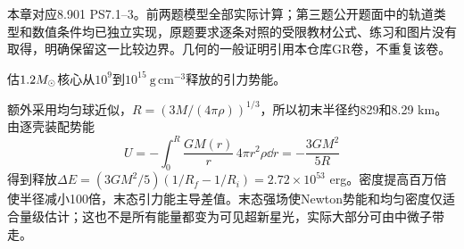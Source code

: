 本章对应8.901 PS7.1--3。前两题模型全部实际计算；第三题公开题面中的轨道类型和数值条件均已独立实现，原题要求逐条对照的受限教材公式、练习和图片没有取得，明确保留这一比较边界。几何的一般证明引用本仓库GR卷，不重复该卷。

\begin{exercise}
估$1.2M_{\odot}$核心从$10^9$到$10^{15}\ \mathrm{g\,cm^{-3}}$释放的引力势能。
\end{exercise}
\begin{solution}
额外采用均匀球近似，$R=(3M/(4\pi\rho))^{1/3}$，所以初末半径约829和8.29 km。由逐壳装配势能
\[
 U=-\int_0^R\frac{GM(r)}r\,4\pi r^2\rho\dd r=-\frac{3GM^2}{5R}
\]
得到释放$\Delta E=(3GM^2/5)(1/R_f-1/R_i)=2.72\times10^{53}$ erg。密度提高百万倍使半径减小100倍，末态引力能主导差值。末态强场使Newton势能和均匀密度仅适合量级估计；这也不是所有能量都变为可见超新星光，实际大部分可由中微子带走。
\end{solution}

